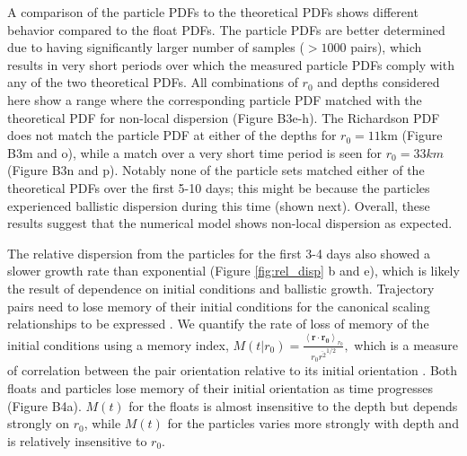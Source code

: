 \documentclass[]{ametsoc}
\begin{document}
A comparison of the particle PDFs to the theoretical PDFs shows different behavior compared to the float PDFs. The particle PDFs are better determined due to having significantly larger number of samples ($>1000$ pairs), which results in very short periods over which the measured particle PDFs comply with any of the two theoretical PDFs. All combinations of $r_0$ and depths considered here show a range where the corresponding particle PDF matched with the theoretical PDF for non-local dispersion (Figure B3e-h). The Richardson PDF does not match the particle PDF at either of the depths for $r_0=11$km (Figure B3m and o), while a match over a very short time period is seen for $r_0=33km$ (Figure B3n and p). Notably none of the particle sets matched either of the theoretical PDFs over the first 5-10 days; this might be because the particles experienced ballistic dispersion during this time (shown next). Overall, these results suggest that the numerical model shows non-local dispersion as expected.

The relative dispersion from the particles for the first 3-4 days also showed a slower growth rate than exponential (Figure \ref{fig:rel_disp} b and e), which is likely the result of dependence on initial conditions and ballistic growth. Trajectory pairs need to lose memory of their initial conditions for the canonical scaling relationships to be expressed \citep{babiano1990relative, nicolleau2004two, bourgoin2006role, foussard2017relative}. We quantify the rate of loss of memory of the initial conditions using a memory index, 
$M(t| r_0) = \frac{\left<\mathbf{r} \cdot \mathbf{r_0} \right>_{r_0}}{r_0 \overline{r^2}^{1/2}},
$
which is a measure of correlation between the pair orientation relative to its initial orientation \citep{foussard2017relative}. Both floats and particles lose memory of their initial orientation as time progresses (Figure B4a). $M(t)$ for the floats is almost insensitive to the depth but depends strongly on $r_0$, while $M(t)$ for the particles varies more strongly with depth and is relatively insensitive to $r_0$. 
\end{document}
